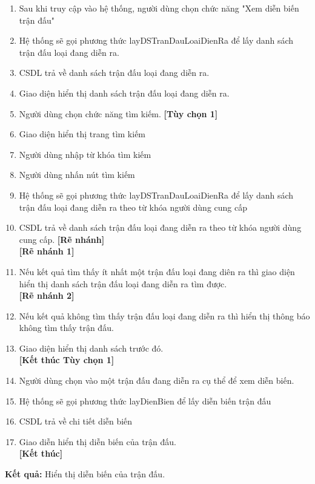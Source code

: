 \noindent
\begin{enumerate}
  \item Sau khi truy cập vào hệ thống, người dùng chọn chức năng "Xem diễn biến trận đấu"
  \item Hệ thống sẽ gọi phương thức layDSTranDauLoaiDienRa để lấy danh sách trận đấu loại đang diễn ra.
  \item CSDL trả về danh sách trận đấu loại đang diễn ra.
  \item Giao diện hiển thị danh sách trận đấu loại đang diễn ra.
  \item Người dùng chọn chức năng tìm kiếm. \textbf{[Tùy chọn 1]}
  \item Giao diện hiển thị trang tìm kiếm
  \item Người dùng nhập từ khóa tìm kiếm
  \item Người dùng nhấn nút tìm kiếm
  \item Hệ thống sẽ gọi phương thức layDSTranDauLoaiDienRa để lấy danh sách trận đấu loại đang diễn ra theo từ khóa người dùng cung cấp
  \item CSDL trả về danh sách trận đấu loại đang diễn ra theo từ khóa người dùng cung cấp. \textbf{[Rẽ nhánh]}
        \\\textbf{[Rẽ nhánh 1]}
  \item Nếu kết quả tìm thấy ít nhất một trận đấu loại đang diên ra thì giao diện hiển thị danh sách trận đấu loại đang diễn ra tìm được.
        \\\textbf{[Rẽ nhánh 2]}
  \item Nếu kết quả không tìm thấy trận đấu loại đang diễn ra thì hiển thị thông báo không tìm thấy trận đấu.
  \item Giao diện hiển thị danh sách trước đó.
        \\\textbf{[Kết thúc Tùy chọn 1]}
  \item Người dùng chọn vào một trận đấu đang diễn ra cụ thể để xem diễn biến.
  \item Hệ thống sẽ gọi phương thức layDienBien để lấy diễn biến trận đấu
  \item CSDL trả về chi tiết diễn biến
  \item Giao diễn hiển thị diễn biến của trận đấu.
        \\\textbf{[Kết thúc]}
\end{enumerate}

\noindent
\textbf{Kết quả:} Hiển thị diễn biến của trận đấu.

